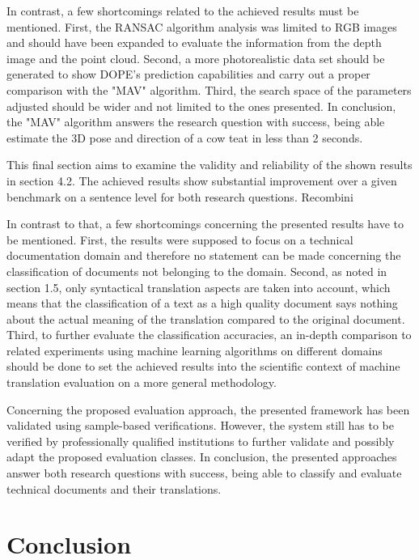     In contrast, a few shortcomings related to the achieved results must be mentioned. First, the RANSAC algorithm analysis was limited to RGB images and should have been expanded to evaluate the information from the depth image and the point cloud. Second, a more photorealistic data set should be generated to show DOPE's prediction capabilities and carry out a proper comparison with the "MAV" algorithm. Third, the search space of the parameters adjusted should be wider and not limited to the ones presented. In conclusion, the "MAV" algorithm answers the research question with success, being able estimate the 3D pose and direction of a cow teat in less than 2 seconds.
    
    
        This ﬁnal section aims to examine the validity and reliability of the shown results in section
    4.2.
    The achieved results show substantial improvement over a given benchmark on a sentence
    level for both research questions. Recombini
    
    
    In contrast to that, a few shortcomings concerning the presented results have to be mentioned.
    First, the results were supposed to focus on a technical documentation domain
    and therefore no statement can be made concerning the classiﬁcation of documents not
    belonging to the domain. Second, as noted in section 1.5, only syntactical translation
    aspects are taken into account, which means that the classiﬁcation of a text as a high
    quality document says nothing about the actual meaning of the translation compared to
    the original document. Third, to further evaluate the classiﬁcation accuracies, an in-depth
    comparison to related experiments using machine learning algorithms on different domains
    should be done to set the achieved results into the scientiﬁc context of machine
    translation evaluation on a more general methodology.
    
    Concerning the proposed evaluation approach, the presented framework has been validated
    using sample-based veriﬁcations. However, the system still has to be veriﬁed by
    professionally qualiﬁed institutions to further validate and possibly adapt the proposed
    evaluation classes. In conclusion, the presented approaches answer both research questions
    with success, being able to classify and evaluate technical documents and their translations.
    





\chapter{Conclusion}\label{chap:conclusion}

